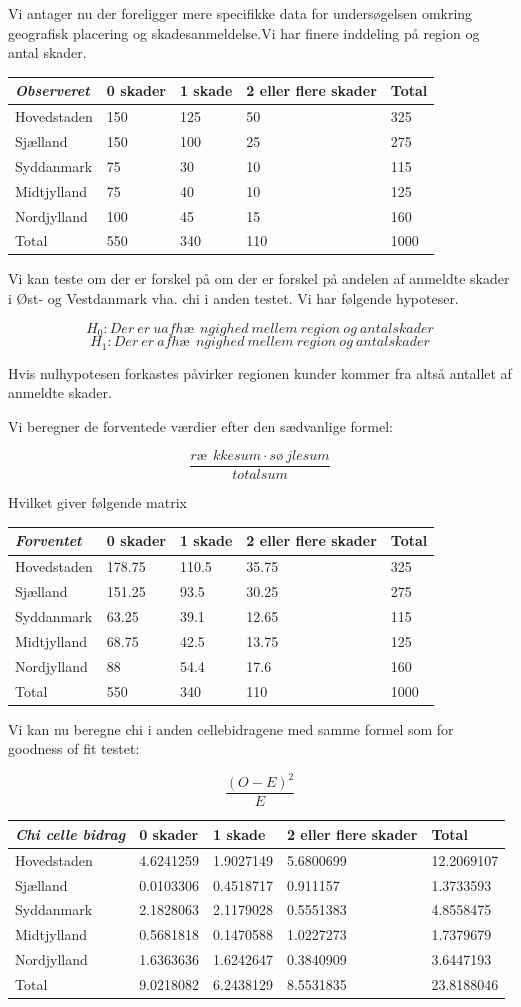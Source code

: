 \documentclass[]{book}
\begin{document}
Vi antager nu der foreligger mere specifikke data for undersøgelsen omkring geografisk placering og skadesanmeldelse.Vi har finere inddeling på region og antal skader.

\begin{longtable}[]{@{}lllll@{}}
\toprule
\textbf{\emph{Observeret}} & 0 skader & 1 skade & 2 eller flere skader & Total\tabularnewline
\midrule
\endhead
Hovedstaden & 150 & 125 & 50 & 325\tabularnewline
Sjælland & 150 & 100 & 25 & 275\tabularnewline
Syddanmark & 75 & 30 & 10 & 115\tabularnewline
Midtjylland & 75 & 40 & 10 & 125\tabularnewline
Nordjylland & 100 & 45 & 15 & 160\tabularnewline
Total & 550 & 340 & 110 & 1000\tabularnewline
\bottomrule
\end{longtable}

Vi kan teste om der er forskel på om der er forskel på andelen af anmeldte skader i Øst- og Vestdanmark vha. chi i anden testet. Vi har følgende hypoteser.

\[H_0: Der\ er\ uafhæ\ \ ngighed\ mellem\ region\ og\ antal skader\]\[H_1: Der\ er\ afhæ\ \ ngighed\ mellem\ region\ og\ antal skader\]

Hvis nulhypotesen forkastes påvirker regionen kunder kommer fra altså antallet af anmeldte skader.

Vi beregner de forventede værdier efter den sædvanlige formel:

\[\frac{ræ\ \ kkesum\cdot sø\ jlesum}{totalsum}\]

Hvilket giver følgende matrix

\begin{longtable}[]{@{}lllll@{}}
\toprule
\textbf{\emph{Forventet}} & 0 skader & 1 skade & 2 eller flere skader & Total\tabularnewline
\midrule
\endhead
Hovedstaden & 178.75 & 110.5 & 35.75 & 325\tabularnewline
Sjælland & 151.25 & 93.5 & 30.25 & 275\tabularnewline
Syddanmark & 63.25 & 39.1 & 12.65 & 115\tabularnewline
Midtjylland & 68.75 & 42.5 & 13.75 & 125\tabularnewline
Nordjylland & 88 & 54.4 & 17.6 & 160\tabularnewline
Total & 550 & 340 & 110 & 1000\tabularnewline
\bottomrule
\end{longtable}

Vi kan nu beregne chi i anden cellebidragene med samme formel som for goodness of fit testet:

\[\frac{(O-E)^2}{E}\]

\begin{longtable}[]{@{}lllll@{}}
\toprule
\textbf{\emph{Chi celle bidrag}} & 0 skader & 1 skade & 2 eller flere skader & Total\tabularnewline
\midrule
\endhead
Hovedstaden & 4.6241259 & 1.9027149 & 5.6800699 & 12.2069107\tabularnewline
Sjælland & 0.0103306 & 0.4518717 & 0.911157 & 1.3733593\tabularnewline
Syddanmark & 2.1828063 & 2.1179028 & 0.5551383 & 4.8558475\tabularnewline
Midtjylland & 0.5681818 & 0.1470588 & 1.0227273 & 1.7379679\tabularnewline
Nordjylland & 1.6363636 & 1.6242647 & 0.3840909 & 3.6447193\tabularnewline
Total & 9.0218082 & 6.2438129 & 8.5531835 & 23.8188046\tabularnewline
\bottomrule
\end{longtable}
\end{document}
